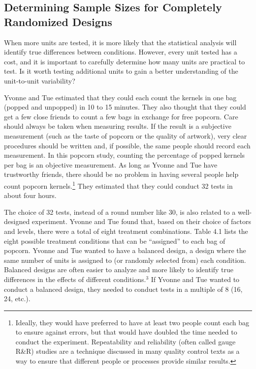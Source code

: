 \documentclass[
]{book}
\begin{document}
\hypertarget{determining-sample-sizes-for-completely-randomized-designs}{%
\subsection*{Determining Sample Sizes for Completely Randomized Designs}\label{determining-sample-sizes-for-completely-randomized-designs}}

When more units are tested, it is more likely that the statistical analysis will identify true differences between conditions. However, every unit tested has a cost, and it is important to carefully determine how many units are practical to test. Is it worth testing additional units to gain a better understanding of the unit-to-unit variability?

Yvonne and Tue estimated that they could each count the kernels in one bag (popped and unpopped) in 10 to 15 minutes. They also thought that they could get a few close friends to count a few bags in exchange for free popcorn. Care should always be taken when measuring results. If the result is a subjective measurement (such as the taste of popcorn or the quality of artwork), very clear procedures should be written and, if possible, the same people should record each measurement. In this popcorn study, counting the percentage of popped kernels per bag is an objective measurement. As long as Yvonne and Tue have trustworthy friends, there should be no problem in having several people help count popcorn kernels.\footnote{Ideally, they would have preferred to have at least two people count each bag to ensure against errors, but that would have doubled the time needed to conduct the experiment. Repeatability and reliability (often called gauge R\&R) studies are a technique discussed in many quality control texts as a way to ensure that different people or processes provide similar results.} They estimated that they could conduct 32 tests in about four hours.

The choice of 32 tests, instead of a round number like 30, is also related to a well-designed experiment. Yvonne and Tue found that, based on their choice of factors and levels, there were a total of eight treatment combinations. Table 4.1 lists the eight possible treatment conditions that can be ``assigned'' to each bag of popcorn. Yvonne and Tue wanted to have a balanced design, a design where the same number of units is assigned to (or randomly selected from) each condition. Balanced designs are often easier to analyze and more likely to identify true differences in the effects of different conditions.\(^3\) If Yvonne and Tue wanted to conduct a balanced design, they needed to conduct tests in a multiple of 8 (16, 24, etc.).
\end{document}

